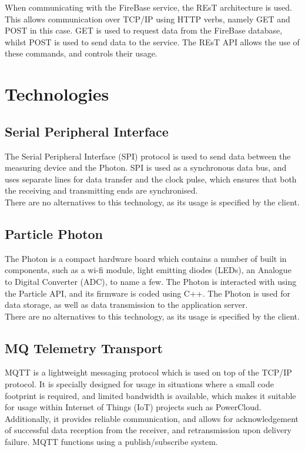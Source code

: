 \documentclass{article}
\begin{document}
	When communicating with the FireBase service, the REsT architecture 
	is used. This allows communication over TCP/IP using HTTP verbs, 
	namely GET and POST in this case. GET is used to request data from 
	the FireBase database, whilst POST is used to send data to the 
	service. The REsT API allows the use of these commands, and controls 
	their usage.

\newpage

\section{Technologies}

	\subsection{Serial Peripheral Interface}
	
	The Serial Peripheral Interface (SPI) protocol is used to send data 
	between the measuring device and the Photon. SPI is used as a 
	synchronous data bus, and uses separate lines for data transfer and 
	the clock pulse, which ensures that both the receiving and 
	transmitting ends are synchronised.\\
	
	\noindent
	There are no alternatives to this technology, as its usage is 
	specified by the client.
	
	\subsection{Particle Photon}
	
	The Photon is a compact hardware board which contains a number of 
	built in components, such as a wi-fi module, light emitting diodes 
	(LEDs), an Analogue to Digital Converter (ADC), to name a few. The 
	Photon is interacted with using the Particle API, and its firmware is 
	coded using C++. The Photon is used for data storage, as well as data 
	transmission to the application server.\\
	
	\noindent
	There are no alternatives to this technology, as its usage is 
	specified by the client.
	
	\subsection{MQ Telemetry Transport}
	
	MQTT is a lightweight messaging protocol which is used on top of the 
	TCP/IP protocol. It is specially designed for usage in situations 
	where a small code footprint is required, and limited bandwidth is 
	available, which makes it suitable for usage within Internet of 
	Things (IoT) projects such as PowerCloud. Additionally, it provides 
	reliable communication, and allows for acknowledgement of successful 
	data reception from the receiver, and retransmission upon delivery 
	failure. MQTT functions using a publish/subscribe system.
	
\end{document}
